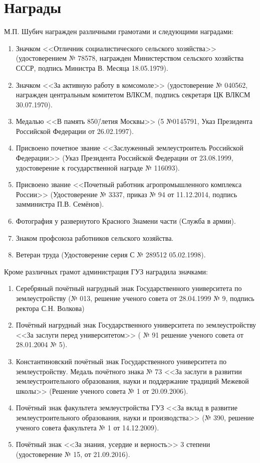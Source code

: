 ﻿\section{Награды}
\noindent М.П. Шубич награжден различными грамотами и следующими наградами: 

\begin{enumerate}
	\item Значком <<Отличник социалистического сельского хозяйства>> (удостоверением № 78578, награжден Министерством сельского хозяйства СССР, подпись Министра В. Месяца 18.05.1979).
	\item Значком <<За активную работу в комсомоле>> (удостоверение № 040562, награжден центральным комитетом ВЛКСМ, подпись секретаря ЦК ВЛКСМ 30.07.1970).
	\item Медалью <<В память 850\=/летия Москвы>> (5 №0145791, Указ Президента Российской Федерации от 26.02.1997).
	\item Присвоено почетное звание <<Заслуженный землеустроитель Российской Федерации>> (Указ Президента Российской Федерации от 23.08.1999, удостоверение к государственной награде № 116093).
	\item Присвоено звание <<Почетный работник агропромышленного комплекса России>> (Удостоверение № 3337, приказ № 94 от 11.12.2014, подпись замминистра П.В. Семёнов).
	\item Фотография у развернутого Красного Знамени части (Служба в армии).
	\item Знаком профсоюза работников сельского хозяйства.
	\item Ветеран труда (Удостоверение серия С № 289512 05.02.1998).
\end{enumerate}

\noindent Кроме различных грамот администрация ГУЗ наградила значками:
\begin{enumerate}	
	\item Серебряный почётный нагрудный знак Государственного университета по землеустройству (№ 013, решение ученого совета от 28.04.1999 № 9, подпись ректора С.Н. Волкова) 
	\item Почётный нагрудный знак Государственного университета по землеустройству <<За заслуги перед университетом>> ( № 91 решение ученого совета от 28.01.2004 № 5).
	\item Константиновский почётный знак Государственного университета по землеустройству. Медаль почётного знака № 73 <<За заслуги в развитии землеустроительного образования, науки и поддержание традиций Межевой школы>> (Решение ученого совета № 1 от 20.09.2006).
	\item Почётный знак факультета землеустройства ГУЗ <<За вклад в развитие землеустроительного образования, науки и производства>> (№ 390, решение ученого совета факультета № 1 от 14.12.2009).
	\item Почётный знак <<За знания, усердие и верность>> 3 степени (удостоверение № 15, от 21.09.2016). 
\end{enumerate}